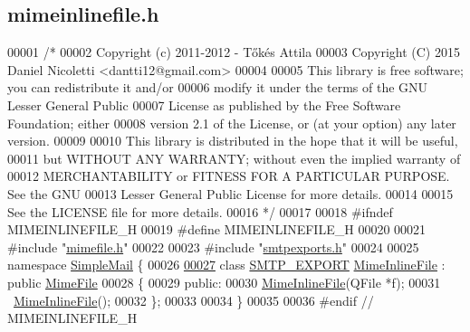 \hypertarget{mimeinlinefile_8h_source}{}\subsection{mimeinlinefile.\+h}
\label{mimeinlinefile_8h_source}

\begin{DoxyCode}
00001 \textcolor{comment}{/*}
00002 \textcolor{comment}{  Copyright (c) 2011-2012 - Tőkés Attila}
00003 \textcolor{comment}{  Copyright (C) 2015 Daniel Nicoletti <dantti12@gmail.com>}
00004 \textcolor{comment}{}
00005 \textcolor{comment}{  This library is free software; you can redistribute it and/or}
00006 \textcolor{comment}{  modify it under the terms of the GNU Lesser General Public}
00007 \textcolor{comment}{  License as published by the Free Software Foundation; either}
00008 \textcolor{comment}{  version 2.1 of the License, or (at your option) any later version.}
00009 \textcolor{comment}{}
00010 \textcolor{comment}{  This library is distributed in the hope that it will be useful,}
00011 \textcolor{comment}{  but WITHOUT ANY WARRANTY; without even the implied warranty of}
00012 \textcolor{comment}{  MERCHANTABILITY or FITNESS FOR A PARTICULAR PURPOSE.  See the GNU}
00013 \textcolor{comment}{  Lesser General Public License for more details.}
00014 \textcolor{comment}{}
00015 \textcolor{comment}{  See the LICENSE file for more details.}
00016 \textcolor{comment}{*/}
00017 
00018 \textcolor{preprocessor}{#ifndef MIMEINLINEFILE\_H}
00019 \textcolor{preprocessor}{#define MIMEINLINEFILE\_H}
00020 
00021 \textcolor{preprocessor}{#include "\hyperlink{mimefile_8h}{mimefile.h}"}
00022 
00023 \textcolor{preprocessor}{#include "\hyperlink{smtpexports_8h}{smtpexports.h}"}
00024 
00025 \textcolor{keyword}{namespace }\hyperlink{namespace_simple_mail}{SimpleMail} \{
00026 
\hyperlink{class_simple_mail_1_1_mime_inline_file}{00027} \textcolor{keyword}{class }\hyperlink{smtpexports_8h_ac580c9660cb24a34b13807f4eb0e1bd0}{SMTP\_EXPORT} \hyperlink{class_simple_mail_1_1_mime_inline_file}{MimeInlineFile} : \textcolor{keyword}{public} \hyperlink{class_simple_mail_1_1_mime_file}{MimeFile}
00028 \{
00029 \textcolor{keyword}{public}:
00030     \hyperlink{class_simple_mail_1_1_mime_inline_file}{MimeInlineFile}(QFile *f);
00031     ~\hyperlink{class_simple_mail_1_1_mime_inline_file}{MimeInlineFile}();
00032 \};
00033 
00034 \}
00035 
00036 \textcolor{preprocessor}{#endif // MIMEINLINEFILE\_H}
\end{DoxyCode}
